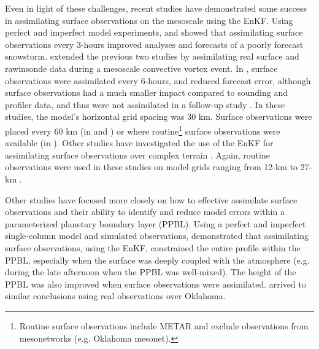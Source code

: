 Even in light of these challenges, recent studies have demonstrated some success in assimilating surface observations on the mesoscale using the EnKF. Using perfect and imperfect model experiments, \citet{zhangetal06a} and \citet{mengzhang07} showed that assimilating surface observations every 3-hours improved analyses and forecasts of a poorly forecast snowstorm. \citet{mengzhang08a} extended the previous two studies by assimilating real surface and rawinsonde data during a mesoscale convective vortex event. In \citet{mengzhang08a}, surface observations were assimilated every 6-hours, and reduced forecast error, although surface observations had a much smaller impact compared to sounding and profiler data, and thus were not assimilated in a follow-up study \citep{mengzhang08b}. In these studies, the model’s horizontal grid spacing was 30 km. Surface observations were placed every 60 km (in \citealt{zhangetal06a} and \citealt{mengzhang07}) or where routine\footnote{Routine surface observations include METAR and exclude observations from mesonetworks (e.g. Oklahoma mesonet).} surface observations were available (in \citealt{mengzhang08a}). Other studies have investigated the use of the EnKF for assimilating surface observations over complex terrain \citep{puetal13,ancelletal11}. Again, routine observations were used in these studies on model grids ranging from 12-km \citep{ancelletal11} to 27-km \citep{puetal13}.

Other studies have focused more closely on how to effective assimilate surface observations and their ability to identify and reduce model errors within a parameterized planetary boundary layer (PPBL). Using a perfect and imperfect single-column model and simulated observations, \citet{hackersnyder05} demonstrated that assimilating surface observations, using the EnKF, constrained the entire profile within the PPBL, especially when the surface was deeply coupled with the atmosphere (e.g. during the late afternoon when the PPBL was well-mixed). The height of the PPBL was also improved when surface observations were assimilated. \citet{hackeredelstein07} arrived to similar conclusions using real observations over Oklahoma.


